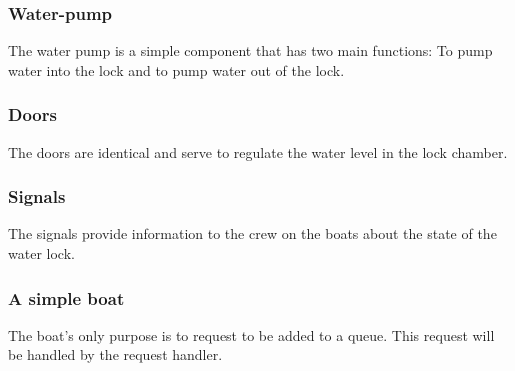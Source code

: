 \documentclass{article}
\begin{document}
        \subsubsection{Water-pump}
            The water pump is a simple component that has two main functions: To pump water into the lock and to pump water out of the lock. 
        \subsubsection{Doors}
            The doors are identical and serve to regulate the water level in the lock chamber. 
        \subsubsection{Signals}
            The signals provide information to the crew on the boats about the state of the water lock.
        \subsubsection{A simple boat}
            The boat's only purpose is to request to be added to a queue. This request will be handled by the request handler.
    
\end{document}
